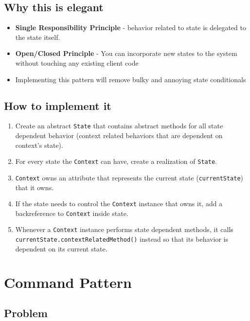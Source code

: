 \subsection{Why this is
elegant}\label{behavioral-patterns.md__why-this-is-elegant-1}

\begin{itemize}
\tightlist
\item
  \textbf{Single Responsibility Principle} - behavior related to state
  is delegated to the state itself.
\item
  \textbf{Open/Closed Principle} - You can incorporate new states to the
  system without touching any existing client code
\item
  Implementing this pattern will remove bulky and annoying state
  conditionals
\end{itemize}

\subsection{How to implement
it}\label{behavioral-patterns.md__how-to-implement-it-1}

\begin{enumerate}
\def\labelenumi{\arabic{enumi}.}
\tightlist
\item
  Create an abstract \texttt{State} that contains abstract methods for
  all state dependent behavior (context related behaviors that are
  dependent on context's state).
\item
  For every state the \texttt{Context} can have, create a realization of
  \texttt{State}.
\item
  \texttt{Context} owns an attribute that represents the current state
  (\texttt{currentState}) that it owns.
\item
  If the state needs to control the \texttt{Context} instance that owns
  it, add a backreference to \texttt{Context} inside state.
\item
  Whenever a \texttt{Context} instance performs state dependent methods,
  it calls \texttt{currentState.contextRelatedMethod()} instead so that
  its behavior is dependent on its current state.
\end{enumerate}

\section{Command Pattern}\label{behavioral-patterns.md__command-pattern}

\subsection{Problem}\label{behavioral-patterns.md__problem-2}

